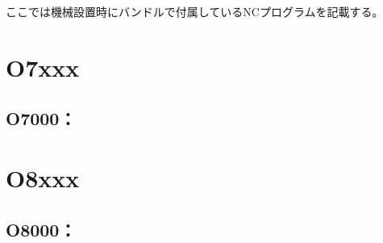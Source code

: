 
ここでは機械設置時にバンドルで付属しているNCプログラムを記載する。


\section{O7xxx}

\subsection{O7000：}
%


\section{O8xxx}


\subsection{O8000：}
%
